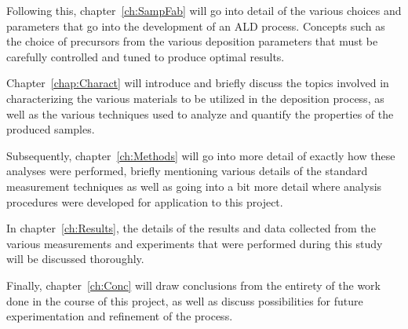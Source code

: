 Following this, chapter~\ref{ch:SampFab} will go into detail of the various choices and parameters that go into the development of an ALD process. Concepts such as the choice of precursors from the various deposition parameters that must be carefully controlled and tuned to produce optimal results. 

Chapter~\ref{chap:Charact} will introduce and briefly discuss the topics involved in characterizing the various materials to be utilized in the deposition process, as well as the various techniques used to analyze and quantify the properties of the produced samples. 

Subsequently, chapter~\ref{ch:Methods} will go into more detail of exactly how these analyses were performed, briefly mentioning various details of the standard measurement techniques as well as going into a bit more detail where analysis procedures were developed for application to this project. 

In chapter~\ref{ch:Results}, the details of the results and data collected from the various measurements and experiments that were performed during this study will be discussed thoroughly.  

Finally, chapter~\ref{ch:Conc} will draw conclusions from the entirety of the work done in the course of this project, as well as discuss possibilities for future experimentation and refinement of the process. 


%
